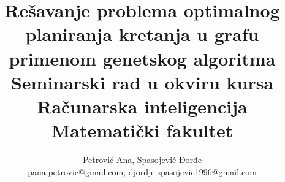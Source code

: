 \documentclass[12pt]{article}
\begin{document}
	
	\title{Rešavanje problema optimalnog planiranja kretanja u grafu primenom genetskog algoritma \\ \large{Seminarski rad u okviru kursa Računarska inteligencija Matematički fakultet}}

	\author{Petrović Ana, Spasojević Đorđe\\pana.petrovic@gmail.com, djordje.spasojevic1996@gmail.com}
	
	
	\maketitle
	\thispagestyle{empty}
	\vspace*{2\baselineskip}
\newpage
	\tableofcontents
	
	\newpage
	
\end{document}
